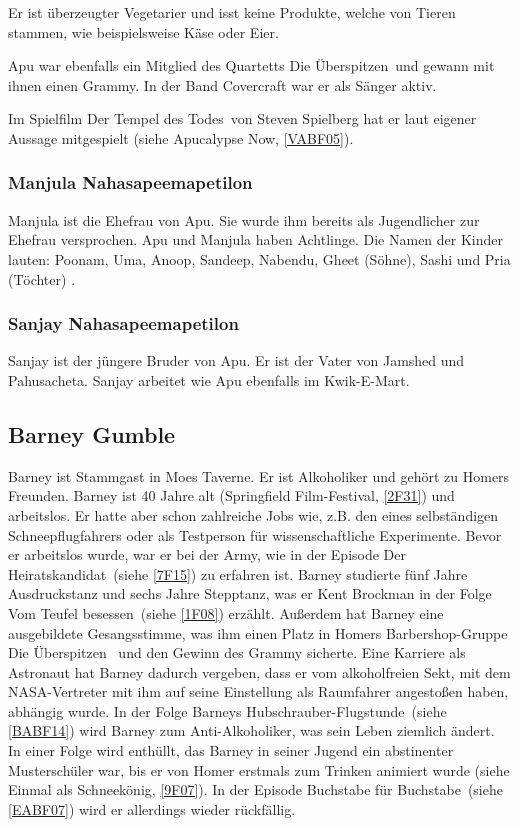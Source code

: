 Er ist überzeugter Vegetarier und isst keine Produkte, welche von Tieren stammen, wie beispielsweise Käse oder Eier.

Apu war ebenfalls ein Mitglied des Quartetts \glqq Die Überspitzen\grqq\ und gewann mit ihnen einen Grammy. In der Band Covercraft war er als Sänger aktiv.

Im Spielfilm \glqq Der Tempel des Todes\grqq\ von Steven Spielberg hat er laut eigener Aussage mitgespielt (siehe \glqq Apucalypse Now\grqq , \ref{VABF05}).


\subsubsection{Manjula Nahasapeemapetilon}
Manjula ist die Ehefrau von Apu. Sie wurde ihm bereits als Jugendlicher zur Ehefrau versprochen. Apu und Manjula haben Achtlinge. Die Namen der Kinder lauten:
Poonam, Uma, Anoop, Sandeep, Nabendu, Gheet (Söhne), Sashi und Pria (Töchter) \cite{SpringfieldAt}.

\subsubsection{Sanjay Nahasapeemapetilon}\label{NahasapeemapetilonSanjay}
Sanjay ist der jüngere Bruder von Apu. Er ist der Vater von Jamshed und Pahusacheta. Sanjay arbeitet wie Apu ebenfalls im Kwik-E-Mart.


\subsection{Barney Gumble}
Barney ist Stammgast in Moes Taverne. Er ist Alkoholiker und gehört zu Homers Freunden. Barney ist 40 Jahre alt (\glqq Springfield Film-Festival\grqq , \ref{2F31}) und arbeitslos. Er hatte aber schon zahlreiche Jobs wie, z.B. den eines selbständigen Schneepflugfahrers oder als Testperson für wissenschaftliche Experimente. Bevor er arbeitslos wurde, war er bei der Army, wie in der Episode \glqq Der Heiratskandidat\grqq\ (siehe \ref{7F15}) zu erfahren ist. Barney studierte fünf Jahre Ausdruckstanz und sechs Jahre Stepptanz, was er Kent Brockman in der Folge \glqq Vom Teufel besessen\grqq\ (siehe \ref{1F08}) erzählt. Außerdem hat Barney eine ausgebildete Gesangsstimme, was ihm einen Platz in Homers Barbershop-Gruppe \glqq Die Überspitzen\grqq\  und den Gewinn des Grammy sicherte. Eine Karriere als Astronaut hat Barney dadurch vergeben, dass er vom alkoholfreien Sekt, mit dem NASA-Vertreter mit ihm auf seine Einstellung als Raumfahrer angestoßen haben, abhängig wurde. In der Folge \glqq Barneys Hubschrauber-Flugstunde\grqq\ (siehe \ref{BABF14}) wird Barney zum Anti-Alkoholiker, was sein Leben ziemlich ändert. In einer Folge wird enthüllt, das Barney in seiner Jugend ein abstinenter Musterschüler war, bis er von Homer erstmals zum Trinken animiert wurde (siehe \glqq Einmal als Schneekönig\grqq , \ref{9F07}). In der Episode \glqq Buchstabe für Buchstabe\grqq\ (siehe \ref{EABF07}) wird er allerdings wieder rückfällig.


